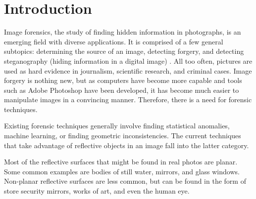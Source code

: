 \chapter{Introduction}





Image forensics, the study of finding hidden information in photographs, is an emerging field with diverse applications. It is comprised of a few general subtopics: determining the source of an image, detecting forgery, and detecting steganography (hiding information in a digital image) \cite{rocha2011}. All too often, pictures are used as hard evidence in journalism, scientific research, and criminal cases. Image forgery is nothing new, but as computers have become more capable and tools such as Adobe Photoshop have been developed, it has become much easier to manipulate images in a convincing manner. Therefore, there is a need for forensic techniques.

Existing forensic techniques generally involve finding statistical anomalies, machine learning, or finding geometric inconsistencies. The current techniques that take advantage of reflective objects in an image fall into the latter category.

Most of the reflective surfaces that might be found in real photos are planar. Some common examples are bodies of still water, mirrors, and glass windows. Non-planar reflective surfaces are less common, but can be found in the form of store security mirrors, works of art, and even the human eye.
